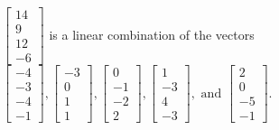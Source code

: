 \begin{exercise}
\begin{exerciseStatement}
  \end{exerciseStatement}
  \begin{exerciseAnswer}
   \(\left[\begin{array}{c}
14 \\
9 \\
12 \\
-6
\end{array}\right]\) 
  	 is  
	a linear combination of the vectors \(\left[\begin{array}{c}
-4 \\
-3 \\
-4 \\
-1
\end{array}\right] , \left[\begin{array}{c}
-3 \\
0 \\
1 \\
1
\end{array}\right] , \left[\begin{array}{c}
0 \\
-1 \\
-2 \\
2
\end{array}\right] , \left[\begin{array}{c}
1 \\
-3 \\
4 \\
-3
\end{array}\right] , \text{ and } \left[\begin{array}{c}
2 \\
0 \\
-5 \\
-1
\end{array}\right]\).

	
  


  \end{exerciseAnswer}
\end{exercise}